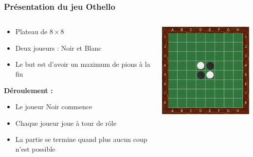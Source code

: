 \begin{frame}
\frametitle{Présentation du jeu Othello}
\begin{columns}
    \begin{column}{0.65\textwidth}
        \begin{itemize}
            \item Plateau de $8 \times 8$
            \item Deux joueurs : Noir et Blanc
            \item Le but est d’avoir un maximum de pions à la fin
        \end{itemize}
        \bigskip
        \textbf{Déroulement :}
        \begin{itemize}
            \item Le joueur Noir commence
            \item Chaque joueur joue à tour de rôle
            \item La partie se termine quand plus aucun coup n’est possible
        \end{itemize}
    \end{column}
    
    \begin{column}{0.35\textwidth}
        \includegraphics[width=\linewidth]{img/debut-othello.jpg}
    \end{column}
\end{columns}
\end{frame}

